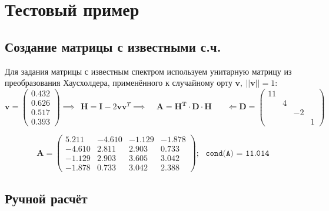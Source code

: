 \section{Тестовый пример}

\subsection{Создание матрицы с известными с.ч.}

Для задания матрицы с известным спектром используем унитарную матрицу из преобразования Хаусхолдера, применённого к случайному орту $\mathbf{v},~||\mathbf{v}||=1$:
\begin{equation}
\mathbf{v} = \begin{pmatrix}0.432\\0.626\\0.517\\0.393\end{pmatrix} \implies~~
\mathbf{H} = \mathbf{I} - 2\mathbf{vv}^T \implies~~~~~ \mathbf{A = H^T\cdot D\cdot H}~~~~~~~~\Longleftarrow
\mathbf{D} = \begin{pmatrix}
    11& &  &\\
      &4&  &\\
      & &-2&\\
      & &  &1
\end{pmatrix}
\end{equation}

\begin{equation}
\mathbf{A} =\begin{pmatrix}
     5.211& -4.610& -1.129& -1.878\\
    -4.610&  2.811&  2.903&  0.733\\
    -1.129&  2.903&  3.605&  3.042\\
    -1.878&  0.733&  3.042&  2.388
\end{pmatrix}; ~~~ \texttt{cond(A) = 11.014}
\end{equation}

\subsection{Ручной расчёт}
